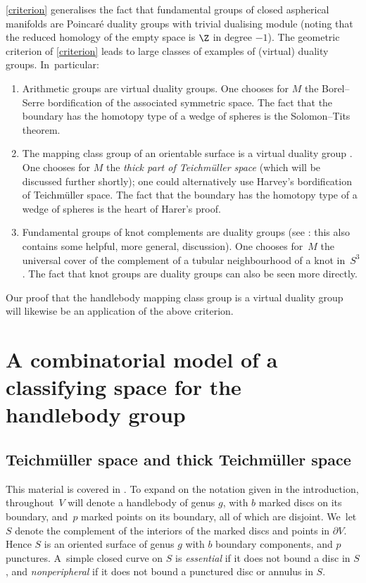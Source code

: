 \cref{criterion} generalises the fact that fundamental groups of closed aspherical manifolds are Poincaré duality groups with trivial dualising module (noting that the reduced homology of the empty space is $\Z$ in degree $-1$). The geometric criterion of \cref{criterion} leads to large classes of examples of (virtual) duality groups. In~particular:
\begin{enumerate}
\item Arithmetic groups are virtual duality groups. One chooses for $M$ the Borel--Serre bordification \cite{borelserre} of the associated symmetric space. The fact that the boundary has the homotopy type of a wedge of spheres is the Solomon--Tits theorem.
\item The mapping class group of an orientable surface is a virtual duality group \cite{harer,ivanov}. One chooses for $M$ the \emph{thick part of Teichmüller space} (which will be discussed further shortly); one could alternatively use Harvey's bordification of Teichmüller space. The fact that the boundary has the homotopy type of a wedge of spheres is the heart of Harer's proof.
\item Fundamental groups of knot complements are duality groups (see \cite[Ex.\,1 in \S VIII.9]{brown2}: this also contains some helpful, more general, discussion). One chooses for~$M$ the universal cover of the complement of a tubular neighbourhood of a knot in~$S^3$. The fact that knot groups are duality groups can also be seen more directly.
\end{enumerate}

Our proof that the handlebody mapping class group is a virtual duality group will likewise be an application of the above criterion.

\section{A combinatorial model of a classifying space for the handlebody group}

\subsection{Teichmüller space and thick Teichmüller space}

This material is covered in \cite[Ch.\,10]{farbmargalit}. To expand on the notation given in the introduction, throughout~$V$ will denote a handlebody of genus $g$, with $b$ marked discs on its boundary, and~$p$ marked points on its boundary, all of which are disjoint. We~let $S$ denote the complement of the interiors of the marked discs and points in $\partial V$. Hence $S$ is an oriented surface of genus $g$ with $b$ boundary components, and $p$ punctures. A~simple closed curve on $S$ is \emph{essential} if it does not bound a disc in $S$, and \emph{nonperipheral} if it does not bound a punctured disc or annulus in $S$.


